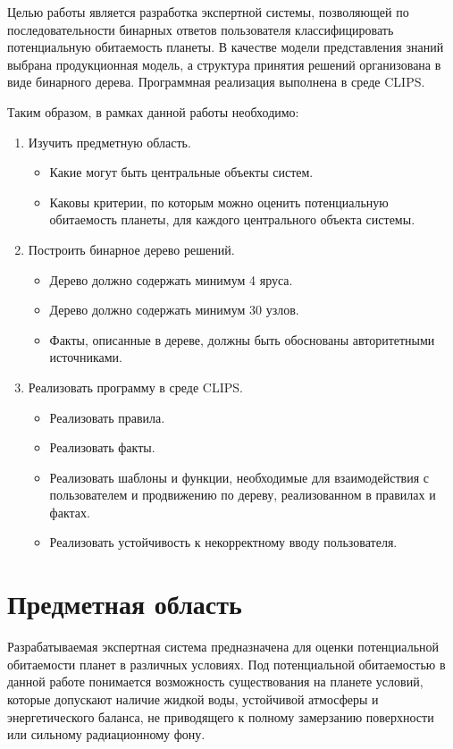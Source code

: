 \documentclass[14pt,a4paper]{extarticle}
\begin{document}
Целью работы является разработка экспертной системы, позволяющей по последовательности бинарных ответов пользователя классифицировать потенциальную обитаемость планеты. В качестве модели представления знаний выбрана продукционная модель, а структура принятия решений организована в виде бинарного дерева. Программная реализация выполнена в среде CLIPS.

Таким образом, в рамках данной работы необходимо:

\begin{enumerate}
  \item Изучить предметную область.
  \begin{itemize}
    \item Какие могут быть центральные объекты систем.
    \item Каковы критерии, по которым можно оценить потенциальную обитаемость планеты, для каждого центрального объекта системы.
  \end{itemize}
  \item Построить бинарное дерево решений.
  \begin{itemize}
    \item Дерево должно содержать минимум 4 яруса.
    \item Дерево должно содержать минимум 30 узлов.
    \item Факты, описанные в дереве, должны быть обоснованы авторитетными источниками.
  \end{itemize}
  \item Реализовать программу в среде CLIPS.
  \begin{itemize}
    \item Реализовать правила.
    \item Реализовать факты.
    \item Реализовать шаблоны и функции, необходимые для взаимодействия с пользователем и продвижению по дереву, реализованном в правилах и фактах.
    \item Реализовать устойчивость к некорректному вводу пользователя.
  \end{itemize}
\end{enumerate}

\newpage

\section{Предметная область}

Разрабатываемая экспертная система предназначена для оценки потенциальной обитаемости планет в различных условиях. Под потенциальной обитаемостью в данной работе понимается возможность существования на планете условий, которые допускают наличие жидкой воды, устойчивой атмосферы и энергетического баланса, не приводящего к полному замерзанию поверхности или сильному радиационному фону.
\end{document}
